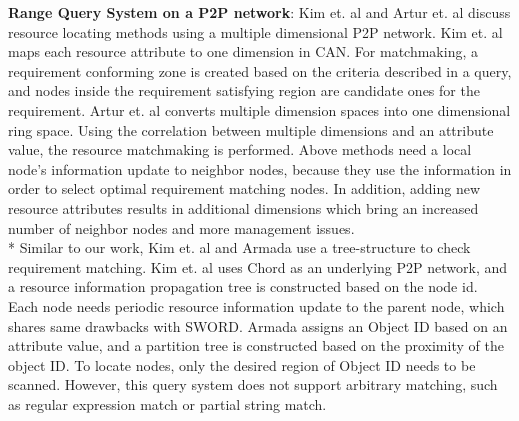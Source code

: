 \documentclass{acm_proc_article-sp}
\begin{document}
\textbf{Range Query System on a P2P network}: Kim et. al\cite{can_query} and Artur et. al\cite{query_for_grid} discuss resource locating methods using a multiple dimensional P2P network. 
Kim et. al\cite{can_query} maps each resource attribute to one dimension in CAN\cite{can}. For matchmaking, a requirement conforming zone is created based on the criteria described in a query, 
and nodes inside the requirement satisfying region are candidate ones for the requirement.
Artur et. al\cite{query_for_grid} converts multiple dimension spaces into one dimensional ring space. Using the correlation between multiple dimensions and an attribute value, 
the resource matchmaking is performed. 
Above methods need a local node's information update to neighbor nodes, because they use the information in order to select optimal requirement matching nodes.  
In addition, adding new resource attributes results in additional dimensions which bring an increased number of neighbor nodes and more management issues.\\*
Similar to our work, Kim et. al\cite{chord_matching} and Armada\cite{armada} use a tree-structure to check requirement matching. 
Kim et. al\cite{chord_matching} uses Chord\cite{chord} as an underlying P2P network, and a resource information propagation tree is
constructed based on the node id. Each node needs periodic resource information update to the parent node, which shares same drawbacks with SWORD.
Armada\cite{armada} assigns an Object ID based on an attribute value, and a partition tree is constructed based on the proximity of the object ID. 
To locate nodes, only the desired region of Object ID needs to be scanned. However, this query system does not support arbitrary matching, such as regular expression match or partial string match.
\end{document}

